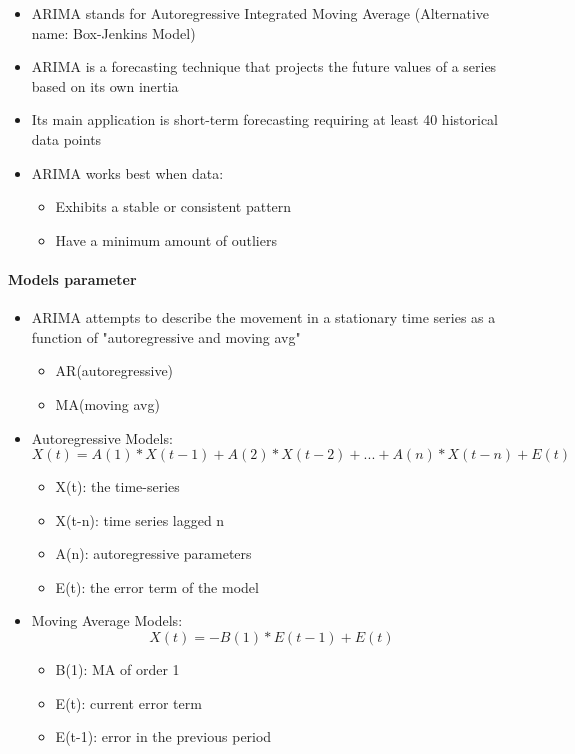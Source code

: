 \documentclass[11pt]{article}
\providecommand{\tightlist}{%
      \setlength{\itemsep}{0pt}\setlength{\parskip}{0pt}}
\begin{document}
\begin{itemize}
\tightlist
\item
  ARIMA stands for Autoregressive Integrated Moving Average (Alternative
  name: Box-Jenkins Model)
\item
  ARIMA is a forecasting technique that projects the future values of a
  series based on its own inertia
\item
  Its main application is short-term forecasting requiring at least 40
  historical data points
\item
  ARIMA works best when data:

  \begin{itemize}
  \tightlist
  \item
    Exhibits a stable or consistent pattern
  \item
    Have a minimum amount of outliers
  \end{itemize}
\end{itemize}

\paragraph{Models parameter}\label{models-parameter}

\begin{itemize}
\tightlist
\item
  ARIMA attempts to describe the movement in a stationary time series as
  a function of "autoregressive and moving avg"

  \begin{itemize}
  \tightlist
  \item
    AR(autoregressive)
  \item
    MA(moving avg)
  \end{itemize}
\item
  Autoregressive Models:
  \[X(t) = A(1)*X(t-1) + A(2)*X(t-2) +... + A(n)*X(t-n) + E(t)\]

  \begin{itemize}
  \tightlist
  \item
    X(t): the time-series
  \item
    X(t-n): time series lagged n
  \item
    A(n): autoregressive parameters
  \item
    E(t): the error term of the model
  \end{itemize}
\item
  Moving Average Models: \[X(t) = -B(1) * E(t-1) + E(t)\]

  \begin{itemize}
  \tightlist
  \item
    B(1): MA of order 1
  \item
    E(t): current error term
  \item
    E(t-1): error in the previous period
  \end{itemize}
\end{itemize}
\end{document}
